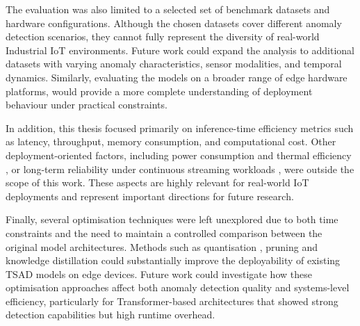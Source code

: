 \documentclass[twoside,11pt,openright]{report}
\newcommand{\todo}[1]{{\color[rgb]{.5,0,0}\textbf{$\blacktriangleright$#1$\blacktriangleleft$}}}
\begin{document}
The evaluation was also limited to a selected set of benchmark datasets and hardware configurations. 
Although the chosen datasets cover different anomaly detection scenarios, they cannot fully represent 
the diversity of real-world Industrial IoT environments. Future work could expand the analysis to additional 
datasets with varying anomaly characteristics, sensor modalities, and temporal dynamics. Similarly, evaluating 
the models on a broader range of edge hardware platforms, would provide a more complete understanding 
of deployment behaviour under practical constraints.

In addition, this thesis focused primarily on inference-time efficiency metrics such as latency, throughput, 
memory consumption, and computational cost. Other deployment-oriented factors, including power 
consumption and thermal efficiency \citep{fanariotis2023power}, or long-term reliability under 
continuous streaming workloads \citep{li2018energy}, 
were outside the scope 
of this work. These aspects are highly relevant for real-world IoT deployments and represent important 
directions for future research.

Finally, several optimisation techniques were left unexplored due to both time constraints and the need to maintain 
a controlled comparison between the original model architectures. Methods such as quantisation \citep{cheng2023compression}, 
pruning \citep{cheng2023compression} and 
knowledge distillation \citep{hinton2015distilling} could substantially improve 
the deployability of existing TSAD models on edge devices. Future work could investigate how these optimisation 
approaches affect both anomaly detection quality and systems-level efficiency, particularly for Transformer-based 
architectures that showed strong detection capabilities but high runtime overhead.


\cleardoublepage
{}
 




\end{document}
